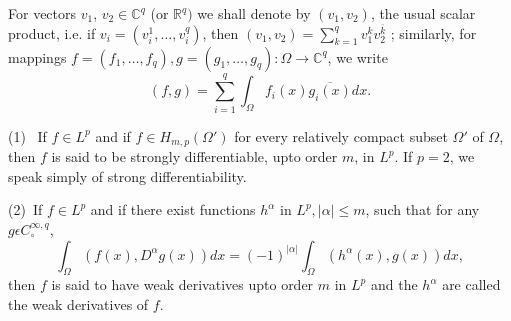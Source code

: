 For vectors $v_1$, $v_2 \in \mathbb{C}^{q}$ (or $ \mathbb{R}^q)$ we
shall denote by $(v_1,v_2)$, the usual scalar product, i.e. if
$v_i=(v^1_i, \ldots, v_i^{q})$, then $  (v_1,v_2)= \sum_{k=1}^{q}
v_1^{k}  v^{\overline{k}}_2$ ; similarly, for mappings $f= (f_1,
\ldots ,f_q) , g = (g_1,\ldots,g_q) : \Omega \to \mathbb{C}^{q}$,
we write 
$$
(f,g)= \sum_{i=1}^{q} \int_{\Omega}f_i(x) \overline{g_i(x)}dx.
$$

\begin{defis*}%
  (1)~ If $f \in L^{p}$ and if $ f \in H_{m,p}(\Omega')$ for
    every relatively compact subset $\Omega'$ of $ \Omega$, then $f$ is
    said to be strongly differentiable, upto order $m$, in $L^{p}$. If
    $p=2$, we speak simply of strong differentiability. 

  (2)~If $f \in L^{p}$ and if there exist functions
    $h^{\alpha}$ in $L^{p}, | \alpha| \leq m$, such that for any $g
    \epsilon C_{\circ}^{\infty,q}$, 
  $$
  \int _{\Omega}(f(x), D^{\alpha}g(x)) dx =(-1)^{|
    \alpha|}\int_{\Omega}(h^{\alpha}(x),g(x)) dx, 
  $$
  then $f$ is said to have weak derivatives upto order $m$ in $L^p$
  and the $h^{\alpha}$ are called the weak derivatives of $f$.
\end{defis*}

